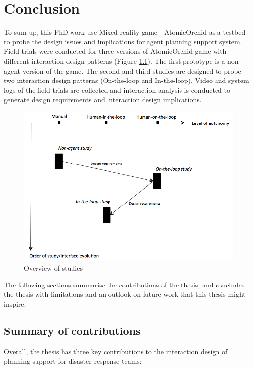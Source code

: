 \chapter{Conclusion}
To sum up, this PhD work use Mixed reality game - AtomicOrchid as a testbed to probe the design issues and implications for agent planning support system. Field trials were conducted for three versions of AtomicOrchid game with different interaction design patterns (Figure \ref{fig:connections}). The first prototype is a non agent version of the game. The second and third studies are designed to probe two interaction design patterns (On-the-loop and In-the-loop). Video and system logs of the field trials are collected and interaction analysis is conducted to generate design requirements and interaction design implications. \\

\begin{figure}[H]
  \centering
  \includegraphics[width=1\textwidth]{img/conclusion/studies}
  \caption{Overview of studies}
  \label{fig:connections}
\end{figure}

The following sections summarise the contributions of the thesis, and concludes the thesis with limitations and an outlook on future work that this thesis might inspire.\\


\section{Summary of contributions}
Overall, the thesis has three key contributions to the interaction design of planning support for disaster response teams:\\

